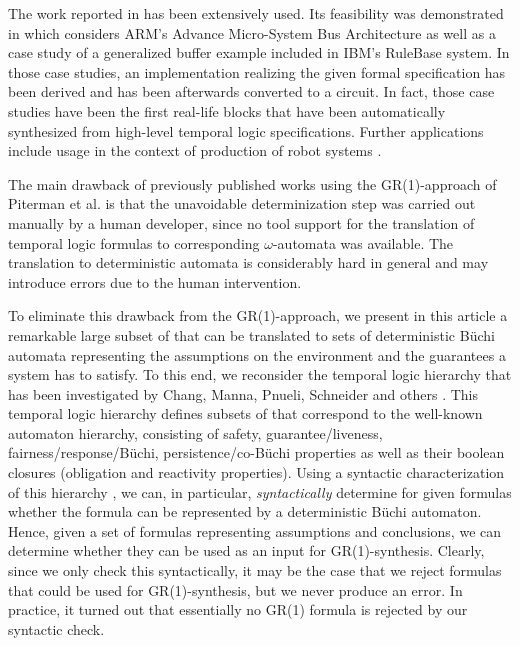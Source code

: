 \documentclass[submission,copyright,creativecommons]{eptcs}
\begin{document}
The work reported in \cite{PiPS06} has been extensively used. Its feasibility was demonstrated in \cite{BGJP07,BGJP07a,JGWB07} which considers ARM's Advance Micro-System Bus Architecture as well as a case study of a generalized buffer example included in IBM's RuleBase system. In those case studies, an implementation realizing the given formal specification has been derived and has been afterwards converted to a circuit. In fact, those case studies have been the first real-life blocks that have been automatically synthesized from high-level temporal logic specifications. Further applications include usage in the context of production of robot systems \cite{WoTM10}.

The main drawback of previously published works using the GR(1)-approach of Piterman et al. is that the unavoidable determinization step was carried out manually by a human developer, since no tool support for the translation of temporal logic formulas to corresponding $\omega$-automata was available. The translation to deterministic automata is considerably hard in general \cite{KuVa98c} and may introduce errors due to the human intervention.

To eliminate this drawback from the GR(1)-approach, we present in this article a remarkable large subset of \LTL{} that can be translated to sets of deterministic Büchi automata representing the assumptions on the environment and the guarantees a system has to satisfy. To this end, we reconsider the temporal logic hierarchy that has been investigated by Chang, Manna, Pnueli, Schneider and others \cite{MaPn87c,ChMP92,MaPn90,MaPn91,Schn01b,Schn03}. This temporal logic hierarchy defines subsets of \LTL{} that correspond to the well-known automaton hierarchy, consisting of safety, guarantee/liveness, fairness/response/Büchi, persistence/co-Büchi properties as well as their boolean closures (obligation and reactivity properties). Using a syntactic characterization of this hierarchy \cite{Schn01b,Schn03}, we can, in particular, \emph{syntactically} determine for given \LTL{} formulas whether the formula can be represented by a deterministic Büchi automaton. Hence, given a set of formulas representing assumptions and conclusions, we can determine whether they can be used as an input for GR(1)-synthesis. Clearly, since we only check this syntactically, it may be the case that we reject formulas that could be used for GR(1)-synthesis, but we never produce an error. In practice, it turned out that essentially no GR(1) formula is rejected by our syntactic check.
\end{document}
